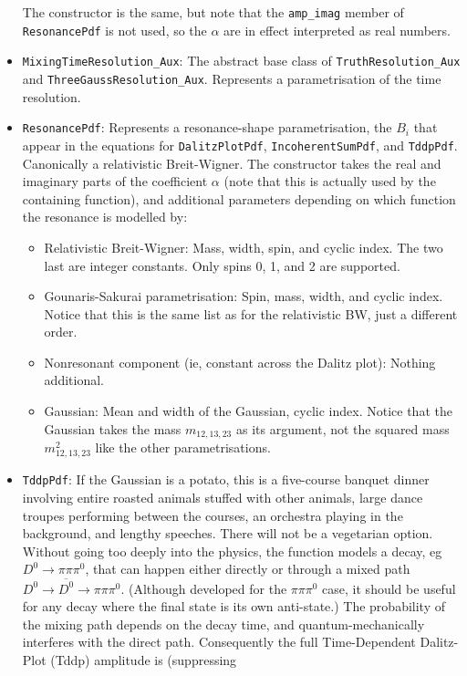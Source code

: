 \documentclass[12pt,pdflatex]{article}
\begin{document}
\begin{itemize}
The constructor is the same, but note that the \texttt{amp\_imag} member of \texttt{ResonancePdf}
is not used, so the $\alpha$ are in effect interpreted as real numbers. 
\item \texttt{MixingTimeResolution\_Aux}: The abstract base class of \texttt{TruthResolution\_Aux}
and \texttt{ThreeGaussResolution\_Aux}. Represents a parametrisation of the time resolution. 
\item \texttt{ResonancePdf}: Represents a resonance-shape parametrisation, the $B_i$
that appear in the equations for \texttt{DalitzPlotPdf}, \texttt{IncoherentSumPdf},
and \texttt{TddpPdf}. Canonically a relativistic Breit-Wigner. The constructor takes
the real and imaginary parts of the coefficient $\alpha$ (note that this is actually used by
the containing function), and additional parameters depending on which function the resonance
is modelled by:
\begin{itemize}
\item Relativistic Breit-Wigner: Mass, width, spin, and cyclic index. The two last are integer constants.
Only spins 0, 1, and 2 are supported. 
\item Gounaris-Sakurai parametrisation: Spin, mass, width, and cyclic index. Notice that this
is the same list as for the relativistic BW, just a different order.
\item Nonresonant component (ie, constant across the Dalitz plot): Nothing additional.
\item Gaussian: Mean and width of the Gaussian, cyclic index. Notice that the Gaussian
takes the mass $m_{12,13,23}$ as its argument, not the squared mass $m^2_{12,13,23}$
like the other parametrisations. 
\end{itemize}
\item \texttt{TddpPdf}: If the Gaussian is a potato, this is a five-course banquet
dinner involving entire roasted animals stuffed with other animals, large dance troupes 
performing between the courses, an orchestra playing in the background, and lengthy
speeches. There will not be a vegetarian option. Without going too deeply into the physics, 
the function models a decay, eg $D^0\to\pi\pi\pi^0$, that can happen either directly or
through a mixed path $D^0\to \overline{D^0}\to\pi\pi\pi^0$. (Although developed for the
$\pi\pi\pi^0$ case, it should be useful for any decay where the final state is its own anti-state.)
The probability of the mixing
path depends on the decay time, and quantum-mechanically interferes with the direct path.
Consequently the full Time-Dependent Dalitz-Plot (Tddp) amplitude is (suppressing

\end{itemize}
\end{document}
